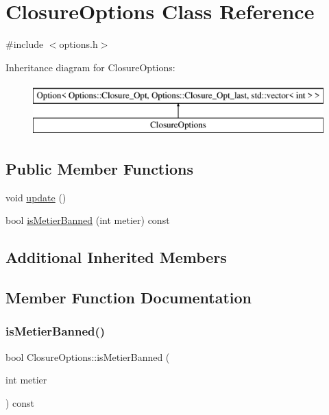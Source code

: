 \hypertarget{class_closure_options}{}\section{Closure\+Options Class Reference}
\label{class_closure_options}


{\ttfamily \#include $<$options.\+h$>$}

Inheritance diagram for Closure\+Options\+:\begin{figure}[H]
\begin{center}
\leavevmode
\includegraphics[height=2.000000cm]{d8/d31/class_closure_options}
\end{center}
\end{figure}
\subsection*{Public Member Functions}
\begin{DoxyCompactItemize}
\item 
void \mbox{\hyperlink{class_closure_options_a798c472d0dccee12eac7a81ba47a86f5}{update}} ()
\item 
bool \mbox{\hyperlink{class_closure_options_a1479926b15f12cae27c46c64fc6a4da9}{is\+Metier\+Banned}} (int metier) const
\end{DoxyCompactItemize}
\subsection*{Additional Inherited Members}


\subsection{Member Function Documentation}
\mbox{\label{class_closure_options_a1479926b15f12cae27c46c64fc6a4da9}} 
\subsubsection{\texorpdfstring{isMetierBanned()}{isMetierBanned()}}
{\footnotesize\ttfamily bool Closure\+Options\+::is\+Metier\+Banned (\begin{DoxyParamCaption}\item[{int}]{metier }\end{DoxyParamCaption}) const\hspace{0.3cm}{\ttfamily [inline]}}

